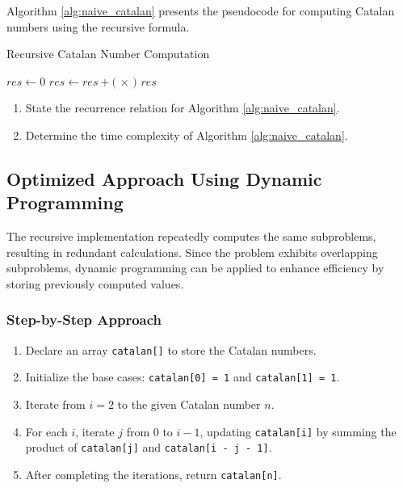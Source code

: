 \documentclass[11pt]{article}
\begin{document}
Algorithm \ref{alg:naive_catalan} presents the pseudocode for computing Catalan numbers using the recursive formula.

\begin{algorithm}
\caption{Recursive Catalan Number Computation}
\label{alg:naive_catalan}
\begin{algorithmic}[1]
        \State {}
    \EndIf
    \State $res \gets 0$
        \State $res \gets res + ($ $\times$ $)$
    \EndFor
    \State \Return $res$
\EndFunction
\end{algorithmic}
\end{algorithm}

\begin{tcolorbox}[title=Exercises]
    \begin{enumerate}
        \item State the recurrence relation for Algorithm \ref{alg:naive_catalan}.
        \item Determine the time complexity of Algorithm \ref{alg:naive_catalan}.
    \end{enumerate}
\end{tcolorbox}

\subsection{Optimized Approach Using Dynamic Programming}

The recursive implementation repeatedly computes the same subproblems, resulting in redundant calculations. Since the problem exhibits overlapping subproblems, dynamic programming can be applied to enhance efficiency by storing previously computed values.

\subsubsection*{Step-by-Step Approach}

\begin{enumerate}
    \item Declare an array \texttt{catalan[]} to store the Catalan numbers.
    \item Initialize the base cases: \texttt{catalan[0] = 1} and \texttt{catalan[1] = 1}.
    \item Iterate from \( i = 2 \) to the given Catalan number \( n \).
    \item For each \( i \), iterate \( j \) from \( 0 \) to \( i-1 \), updating \texttt{catalan[i]} by summing the product of \texttt{catalan[j]} and \texttt{catalan[i - j - 1]}.
    \item After completing the iterations, return \texttt{catalan[n]}.
\end{enumerate}
\end{document}

